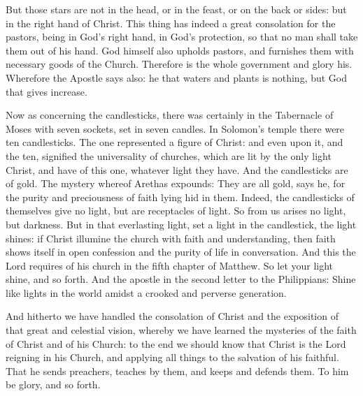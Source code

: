 But those stars are not in the head, or in the feast, or on the back or sides: but in the right hand of Christ. This thing has indeed a great consolation for the pastors, being in God’s right hand, in God’s protection, so that no man shall take them out of his hand. God himself also upholds pastors, and furnishes them with necessary goods of the Church. Therefore is the whole government and glory his. Wherefore the Apostle says also: he that waters and plants is nothing, but God that gives increase.

Now as concerning the candlesticks, there was certainly in the Tabernacle of Moses with seven sockets, set in seven candles. In Solomon’s temple there were ten candlesticks. The one represented a figure of Christ: and even upon it, and the ten, signified the universality of churches, which are lit by the only light Christ, and have of this one, whatever light they have. And the candlesticks are of gold. The mystery whereof Arethas expounds: They are all gold, says he, for the purity and preciousness of faith lying hid in them. Indeed, the candlesticks of themselves give no light, but are receptacles of light. So from us arises no light, but darkness. But in that everlasting light, set a light in the candlestick, the light shines: if Christ illumine the church with faith and understanding, then faith shows itself in open confession and the purity of life in conversation. And this the Lord requires of his church in the fifth chapter of Matthew. So let your light shine, and so forth. And the apostle in the second letter to the Philippians: Shine like lights in the world amidst a crooked and perverse generation.

And hitherto we have handled the consolation of Christ and the exposition of that great and celestial vision, whereby we have learned the mysteries of the faith of Christ and of his Church: to the end we should know that Christ is the Lord reigning in his Church, and applying all things to the salvation of his faithful. That he sends preachers, teaches by them, and keeps and defends them. To him be glory, and so forth.

